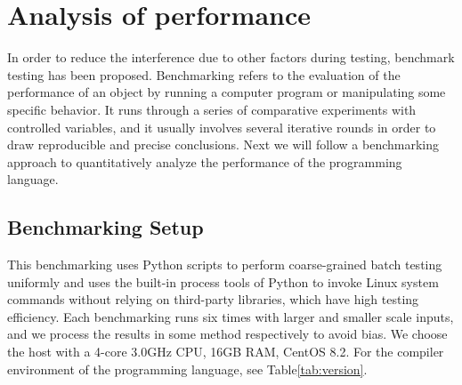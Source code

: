 \section{Analysis of performance}

In order to reduce the interference due to other factors
during testing, benchmark testing has been proposed.
Benchmarking refers to the evaluation of
the performance of an object by running a computer program or
manipulating some specific behavior\cite{fleming1986not}.
It runs through a series of comparative experiments with controlled variables,
and it usually involves several iterative rounds in order to draw
reproducible and precise conclusions.
Next we will follow a benchmarking approach to quantitatively
analyze the performance of the programming language.

\subsection{Benchmarking Setup}


This benchmarking uses Python scripts to perform coarse-grained batch testing
uniformly and uses the built-in process tools of Python to invoke Linux system
commands without relying on third-party libraries, which have high testing efficiency.
Each benchmarking runs six times with larger and smaller scale inputs,
and we process the results in some method respectively to avoid bias.
We choose the host with a 4-core 3.0GHz CPU, 16GB RAM, CentOS 8.2.
For the compiler environment of the programming language, see Table\ref{tab:version}.

